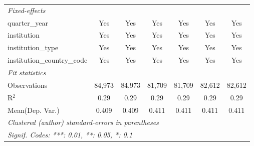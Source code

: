 \begin{tabular}{lcccccc}
   \midrule
   \emph{Fixed-effects}\\
   quarter\_year                      & Yes     & Yes           & Yes     & Yes           & Yes     & Yes\\  
   institution                        & Yes     & Yes           & Yes     & Yes           & Yes     & Yes\\  
   institution\_type                  & Yes     & Yes           & Yes     & Yes           & Yes     & Yes\\  
   institution\_country\_code         & Yes     & Yes           & Yes     & Yes           & Yes     & Yes\\  
   \midrule
   \emph{Fit statistics}\\
   Observations                       & 84,973  & 84,973        & 81,709  & 81,709        & 82,612  & 82,612\\  
   R$^2$                              & 0.29    & 0.29          & 0.29    & 0.29          & 0.29    & 0.29\\  
Mean(Dep. Var.) & 0.409 & 0.409 & 0.411 & 0.411 & 0.411 & 0.411 \\
   \midrule \midrule
   \multicolumn{7}{l}{\emph{Clustered (author) standard-errors in parentheses}}\\
   \multicolumn{7}{l}{\emph{Signif. Codes: ***: 0.01, **: 0.05, *: 0.1}}\\
\end{tabular}
\par\endgroup
